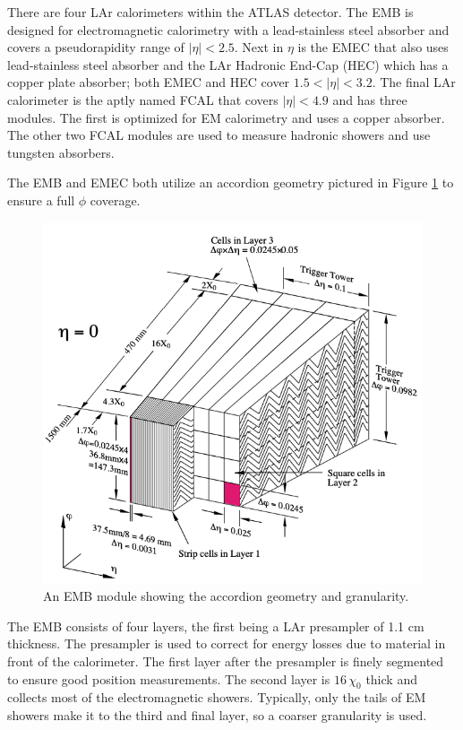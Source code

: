 			There are four \gls{LAr} calorimeters within the \gls{ATLAS} detector. The \gls{EMB} is designed for electromagnetic calorimetry with a lead-stainless steel absorber and covers a pseudorapidity range of $|\eta|<2.5$. Next in $\eta$ is the \gls{EMEC} that also uses lead-stainless steel absorber and the \gls{LAr} Hadronic End-Cap (HEC) which has a copper plate absorber; both \gls{EMEC} and \gls{HEC} cover $1.5 < |\eta| < 3.2$. The final \gls{LAr} calorimeter is the aptly named \gls{FCAL} that covers $|\eta|<4.9$ and has three modules. The first is optimized for \gls{EM} calorimetry and uses a copper absorber. The other two \gls{FCAL} modules are used to measure hadronic showers and use tungsten absorbers.

			The \gls{EMB} and \gls{EMEC} both utilize an accordion geometry pictured in Figure \ref{fig:LAr-accordion} to ensure a full $\phi$ coverage. 
			\begin{figure}[!ht]{}
			\centering
			\includegraphics[width=.45\textwidth,keepaspectratio=true]{chapters/chapter3_experiment/images/LAr_Accordion_Geometry.png}
			\caption{An \gls{EMB} module showing the accordion geometry and granularity. \cite{LAr-TDR}} %
			\label{fig:LAr-accordion}
			\end{figure}
			The \gls{EMB} consists of four layers, the first being a \gls{LAr} presampler of 1.1 cm thickness. The presampler is used to correct for energy losses due to material in front of the calorimeter. The first layer after the presampler is finely segmented to ensure good position measurements. The second layer is $16 \, \chi_0$ thick and collects most of the electromagnetic showers. Typically, only the tails of \gls{EM} showers make it to the third and final layer, so a coarser granularity is used. 

